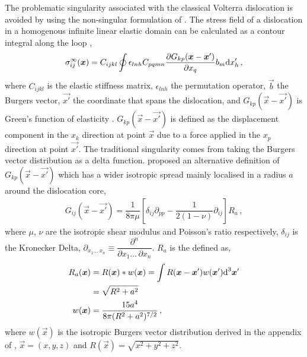 The problematic singularity associated with the classical Volterra dislocation is avoided by using the non-singular formulation of \citet{a_non-singular_continuum_theory_of_dislocations}. The stress field of a dislocation in a homogenous infinite linear elastic domain can be calculated as a contour integral along the loop \cite{mura_t},
\begin{align}\label{eq:field_stress}
	\sigma_{ij}^{\infty}(\vec{x}) = C_{ijkl} \oint \epsilon_{lnh} C_{pqmn} \dfrac{\partial G_{kp}(\vec{x} - \vec{x'})}{\partial x_{q}} b_{m} \rvar{d}x'_{h}\,,
\end{align}
where $ C_{ijkl} $ is the elastic stiffness matrix, $ \epsilon_{lnh} $ the permutation operator, $\vec{b}$ the Burgers vector, $ \vec{x'} $ the coordinate that spans the dislocation, and $ G_{kp}(\vec{x} - \vec{x'}) $ is Green's function of elasticity \cite{mura_t}. $ G_{kp}(\vec{x} - \vec{x'}) $ is defined as the displacement component in the $ x_{k} $ direction at point $ \vec{x} $ due to a force applied in the $ x_{p} $ direction at point $ \vec{x'} $. The traditional singularity comes from taking the Burgers vector distribution as a delta function. \citet{a_non-singular_continuum_theory_of_dislocations} proposed an alternative definition of $ G_{kp}(\vec{x} - \vec{x'}) $ which has a wider isotropic spread mainly localised in a radius $ a $ around the dislocation core,
\begin{align}\label{eq:elastic_green_func}
	G_{ij}(\vec{x} - \vec{x'}) = \dfrac{1}{8\pi \mu}\left[ \delta_{ij} \partial_{pp} - \dfrac{1}{2(1-\nu)} \partial_{ij} \right] R_{a}\,,
\end{align}
where $ \mu $, $ \nu $ are the isotropic shear modulus and Poisson's ratio respectively, $ \delta_{ij} $ is the Kronecker Delta, $ \partial_{x_{1} \ldots\, x_{n}} \equiv \dfrac{\partial^{n}}{\partial x_{1} \ldots\, \partial x_{n}}$. $ R_{a} $ is the defined as,
\begin{subequations}
	\begin{align}\label{eq:ra}
		R_{a}(\vec{x}) & = R(\vec{x}) * w(\vec{x}) = \int R(\vec{x} - \vec{x'}) w(\vec{x'}) \rvar{d}^{3}\vec{x'}\nn
		               & = \sqrt{R^{2} + a^{2}}                                                                     \\
		w(\vec{x})     & = \dfrac{15 a^{4}}{8\pi (R^{2} + a^{2})^{7/2}}\,,
	\end{align}
\end{subequations}
where $ w(\vec{x}) $ is the isotropic Burgers vector distribution derived in the appendix of \cite{a_non-singular_continuum_theory_of_dislocations}, $ \vec{x} = (x, y, z) $ and $ R(\vec{x}) = \sqrt{x^{2} + y^{2} + z^{2}} $.

